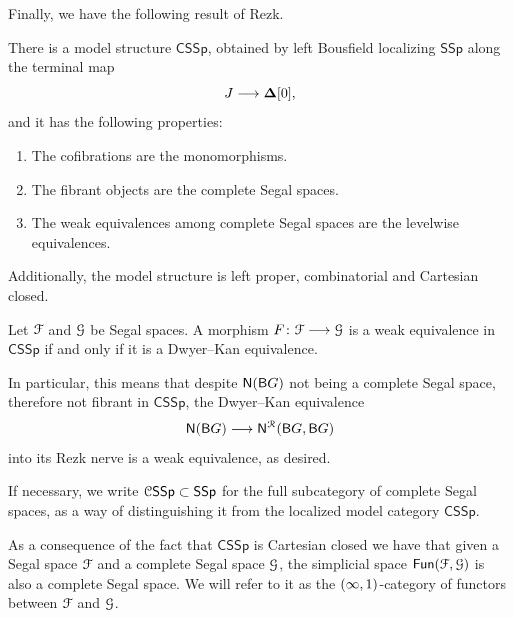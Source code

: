 Finally, we have the following result of Rezk.

\begin{proposition}\label{ch2:: prop: Rezk-model-structure}
    There is a model structure $\mathsf{CSSp}$, obtained by left Bousfield
    localizing $\mathsf{SSp}$ along the terminal map
    \[\label{local map complete} J \longrightarrow \mathbf\Delta[0],\]
    and it has the following properties:
    \begin{enumerate}
        \item The cofibrations are the monomorphisms.
        \item The fibrant objects are the complete Segal spaces.
        \item The weak equivalences among complete Segal spaces are the levelwise equivalences.  
    \end{enumerate}
    Additionally, the model structure is left proper, combinatorial and Cartesian closed.
\end{proposition}


\begin{theorem}\cite[Theorem 7.7]{Rezk01}
    Let $\mathcal F$ and $\mathcal G$ be Segal spaces. A morphism $F \colon \mathcal F \longrightarrow \mathcal G$
    is a weak equivalence in $\mathsf{CSSp}$ if and only if it is a
    Dwyer--Kan equivalence. 
\end{theorem}

In particular, this means that despite $\mathsf N(\mathsf B G)$ not being a complete Segal
space, therefore not fibrant in $\mathsf{CSSp}$, the Dwyer--Kan equivalence
\begin{equation}
    \mathsf N(\mathsf B G) \longrightarrow \mathsf N^{\mathcal R}(\mathsf B G, \mathsf B G)
\end{equation}
into its Rezk nerve is a weak equivalence, as desired.

\begin{remark}
    If necessary, we write $\mathcal C \mathsf{SSp}\subset \mathsf{SSp}$ for the full
    subcategory of complete Segal spaces, as a way of distinguishing it from
    the localized model category $\mathsf{CSSp}$.
\end{remark}

\begin{remark}
    As a consequence of the fact that $\mathsf{CSSp}$ is Cartesian closed we
    have that given a Segal space $\mathcal F$ and a complete Segal space $\mathcal G$, the
    simplicial space $\operatorname{\sf Fun}(\mathcal F,\mathcal G)$ is also a complete Segal space. We will
    refer to it as the $(\operatorname{\infty},1)$-category of functors between $\mathcal F$ and $\mathcal G$.
\end{remark}





